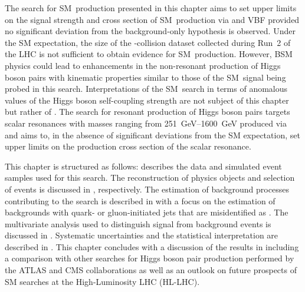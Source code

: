 The search for SM~\HH production presented in this chapter aims to set upper
limits on the signal strength and cross section of SM~\HH production via \ggF
and VBF provided no significant deviation from the background-only hypothesis is
observed. Under the SM expectation, the size of the \pp-collision dataset
collected during Run~2 of the LHC is not sufficient to obtain evidence for
SM~\HH production. However, BSM physics could lead to enhancements in the
non-resonant production of Higgs boson pairs with kinematic properties similar
to those of the SM~\HH signal being probed in this search. Interpretations of
the SM~\HH search in terms of anomalous values of the Higgs boson self-coupling
strength are not subject of this chapter but rather of
. The search for resonant production of Higgs
boson pairs targets scalar resonances with masses ranging from
\SIrange{251}{1600}{\GeV} produced via \ggF and aims to, in the absence of
significant deviations from the SM expectation, set upper limits on the
production cross section of the scalar resonance.

This chapter is structured as follows:  describes
the data and simulated event samples used for this search. The reconstruction of
physics objects and selection of events is discussed in
, respectively. The
estimation of background processes contributing to the search is described in
 with a focus on the estimation of backgrounds
with quark- or gluon-initiated jets that are misidentified as \tauhadvis. The
multivariate analysis used to distinguish signal from background events is
discussed in . Systematic uncertainties and the
statistical interpretation are described in
. This chapter concludes with a
discussion of the results in  including a comparison
with other searches for Higgs boson pair production performed by the ATLAS and
CMS collaborations as well as an outlook on future prospects of SM \HH searches
at the High-Luminosity LHC (HL-LHC).


